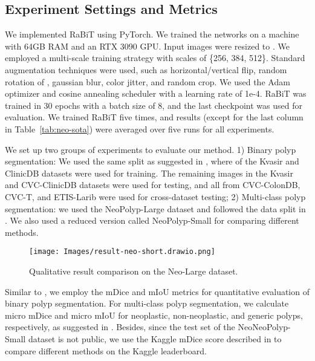 \documentclass{article}
\begin{document}
\subsection{Experiment Settings and Metrics}
\label{subsec:settings}
We implemented RaBiT using PyTorch. We trained the networks on a machine with 64GB RAM and an RTX 3090 GPU. Input images were resized to . We employed a multi-scale training strategy with scales of \{256, 384, 512\}. 
Standard augmentation techniques were used, such as horizontal/vertical flip, random rotation of , gaussian blur, color jitter, and random crop.
We used the Adam optimizer and cosine annealing scheduler with a learning rate of 1e-4. RaBiT was trained in 30 epochs with a batch size of 8, and the last checkpoint was used for evaluation. We trained RaBiT five times, and results (except for the last column in Table~\ref{tab:neo-sota}) were averaged over five runs for all experiments.

We set up two groups of experiments to evaluate our method. 1) Binary polyp segmentation:  We used the same split as suggested in \cite{pranet}, where  of the Kvasir and ClinicDB datasets were used for training. The remaining images in the Kvasir and CVC-ClinicDB datasets were used for testing, and all from CVC-ColonDB, CVC-T, and ETIS-Larib were used for cross-dataset testing; 2) Multi-class polyp segmentation: we used the NeoPolyp-Large dataset and followed the data split in \cite{ngoc2021neounet}. We also used a reduced version called NeoPolyp-Small \cite{neopolyp-small} for comparing different methods.  
\begin{figure*}[!ht]
\centering
\texttt{[image: Images/result-neo-short.drawio.png]}
\caption{Qualitative result comparison on the Neo-Large dataset.}
\label{fig:neo}
\end{figure*}

Similar to \cite{pranet}, we employ the mDice and mIoU metrics for quantitative evaluation of binary polyp segmentation. For multi-class polyp segmentation, we calculate micro mDice and micro mIoU for neoplastic, non-neoplastic, and generic polyps, respectively, as suggested in \cite{ngoc2021neounet}. Besides, since the test set of the NeoNeoPolyp-Small dataset is not public, we use the Kaggle mDice score described in \cite{neopolyp-small} to compare different methods on the Kaggle leaderboard.
\end{document}
